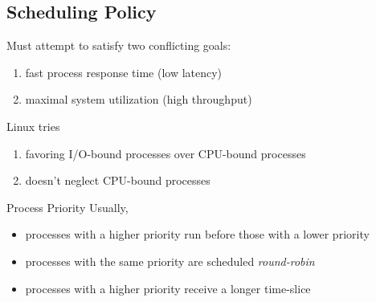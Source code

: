 \subsection{Scheduling Policy}

\begin{frame}
  Must attempt to satisfy two conflicting goals:
  \begin{enumerate}
  \item fast process response time (low latency)
  \item maximal system utilization (high throughput)
  \end{enumerate}
  \vspace{1em}
  
  Linux tries
  \begin{enumerate}
  \item favoring I/O-bound processes over CPU-bound processes
  \item doesn't neglect CPU-bound processes
  \end{enumerate}
\end{frame}

\begin{frame}{Process Priority}
  Usually,
  \begin{itemize}
  \item processes with a higher priority run before those with a lower priority
  \item processes with the same priority are scheduled \emph{round-robin}
  \item processes with a higher priority receive a longer time-slice
  \end{itemize}
\end{frame}

